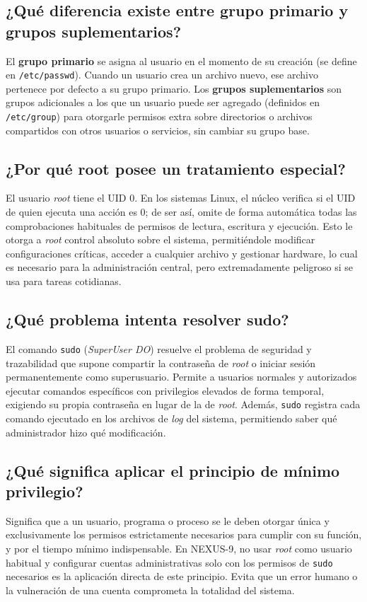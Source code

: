 \documentclass[12pt,a4paper]{article}
\begin{document}
\subsection*{¿Qué diferencia existe entre grupo primario y grupos suplementarios?}
El \textbf{grupo primario} se asigna al usuario en el momento de su creación (se define en \texttt{/etc/passwd}). Cuando un usuario crea un archivo nuevo, ese archivo pertenece por defecto a su grupo primario. Los \textbf{grupos suplementarios} son grupos adicionales a los que un usuario puede ser agregado (definidos en \texttt{/etc/group}) para otorgarle permisos extra sobre directorios o archivos compartidos con otros usuarios o servicios, sin cambiar su grupo base.

\subsection*{¿Por qué root posee un tratamiento especial?}
El usuario \textit{root} tiene el UID 0. En los sistemas Linux, el núcleo verifica si el UID de quien ejecuta una acción es 0; de ser así, omite de forma automática todas las comprobaciones habituales de permisos de lectura, escritura y ejecución. Esto le otorga a \textit{root} control absoluto sobre el sistema, permitiéndole modificar configuraciones críticas, acceder a cualquier archivo y gestionar hardware, lo cual es necesario para la administración central, pero extremadamente peligroso si se usa para tareas cotidianas.

\subsection*{¿Qué problema intenta resolver sudo?}
El comando \texttt{sudo} (\textit{SuperUser DO}) resuelve el problema de seguridad y trazabilidad que supone compartir la contraseña de \textit{root} o iniciar sesión permanentemente como superusuario. Permite a usuarios normales y autorizados ejecutar comandos específicos con privilegios elevados de forma temporal, exigiendo su propia contraseña en lugar de la de \textit{root}. Además, \texttt{sudo} registra cada comando ejecutado en los archivos de \textit{log} del sistema, permitiendo saber qué administrador hizo qué modificación.

\subsection*{¿Qué significa aplicar el principio de mínimo privilegio?}
Significa que a un usuario, programa o proceso se le deben otorgar única y exclusivamente los permisos estrictamente necesarios para cumplir con su función, y por el tiempo mínimo indispensable. En NEXUS-9, no usar \textit{root} como usuario habitual y configurar cuentas administrativas solo con los permisos de \texttt{sudo} necesarios es la aplicación directa de este principio. Evita que un error humano o la vulneración de una cuenta comprometa la totalidad del sistema.
\end{document}

